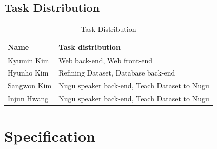 \documentclass[conference]{IEEEtran}
\begin{document}
\subsection{Task Distribution}

\begin{table}[htbp]
  \renewcommand{\arraystretch}{1.5}
\caption{Task Distribution}
\begin{center}
\begin{tabular}{|p{2cm}|p{5cm}|}
\hline
\textbf{Name} & \textbf{Task distribution}\\
\hline
Kyumin Kim & Web back-end, Web front-end \\
\hline
Hyunho Kim & Refining Dataset, Database back-end \\
\hline
Sangwon Kim & Nugu speaker back-end, Teach Dataset to Nugu\\
\hline
Injun Hwang & Nugu speaker back-end, Teach Dataset to Nugu\\
\hline

\end{tabular}
\label{tab2}
\end{center}
\end{table}
   \vspace{10mm}

\section{Specification}
\end{document}
